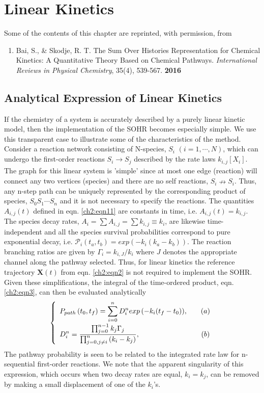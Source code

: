 \chapter{Linear Kinetics}
\label{chapter:linear_kinetics}
Some of the contents of this chapter are reprinted, with permission, from \
\begin{enumerate}
\item[\cite{ch4_10_bai2016sum}] Bai, S., \& Skodje, R. T. The Sum Over Histories Representation for Chemical Kinetics: A Quantitative Theory Based on Chemical Pathways. \textit{International Reviews in Physical Chemistry}, 35(4), 539-567. \textbf{2016}
\end{enumerate}
\section{Analytical Expression of Linear Kinetics}
\label{ch2dot5:sec:analytical}
If the chemistry of a system is accurately described by a purely linear kinetic model,
then the implementation of the SOHR becomes especially simple. We use this transparent
case to illustrate some of the characteristics of the method. Consider a reaction network
consisting of N-species, $S_i$ $(i = 1, \cdots, N)$, which can undergo the first-order
reactions $S_i \xrightarrow[]{} S_j$ described by the rate laws $k_{i,j}[X_i]$. The graph for this linear system is
'simple' since at most one edge (reaction) will connect any two vertices (species) and
there are no self reactions, $S_i \nrightarrow S_i$. Thus, any n-step path can be uniquely represented
by the corresponding product of species, $S_0S_1 \cdots S_n$ and it is not necessary to specify
the reactions. The quantities $A_{i,j}(t)$ defined in eqn. \ref{ch2:eqn11} are constants in time, i.e.
$A_{i,j}(t) = k_{i,j}$. The species decay rates, $A_i = \sum{A_{i,j}} = \sum{k_{i,j}} \equiv k_i$, are likewise time-independent
and all the species survival probabilities correspond to pure exponential decay, i.e.
${\mathcal{P}}_{i}(t_a, t_b)=exp\left(-k_i(k_a-k_b)\right)$. The reaction branching ratios are given by $\Gamma_i=k_{i,J}/k_i$ where
$J$ denotes the appropriate channel along the pathway selected. Thus, for linear kinetics
the reference trajectory $\mathbf{X}(t)$ from eqn. \ref{ch2:eqn2} is not required to implement the
SOHR. Given these simplifications, the integral of the time-ordered product, eqn. \ref{ch2:eqn3}, can then be evaluated analytically\cite{ch1_IRPC_16_ch3_6_ch4_8_bai2014sum}
\begin{eqnarray}
  \twochoices
	{P_{path} \left(t_0, t_f \right) = \sum_{i=0}^{n}{D_i^n exp \left( -k_i(t_f - t_0) \right)}, && (a)}
	{D_i^n = \frac{\prod_{j=0}^{n-1}{k_j\Gamma_j}}{\prod_{j=0,j \neq i}^{n}{ \left( k_i - k_j \right) }}, && (b)}
\label{ch2dot5:eqn1}
\end{eqnarray}
The pathway probability is seen to be related to the integrated rate law for n-sequential
first-order reactions.\cite{ch1_IRPC_47_abel1906besonders} We note that the apparent singularity of this expression, which
occurs when two decay rates are equal, $k_i = k_j$, can be removed by making a small displacement
of one of the $k_i$'s.
\newline
